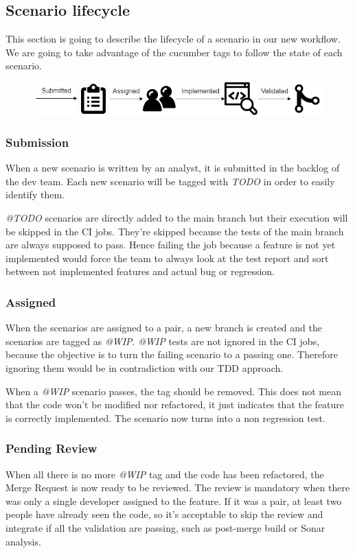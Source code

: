 \subsection{Scenario lifecycle}\label{subsec:scenario-lifecycle}
This section is going to describe the lifecycle of a scenario in our new
workflow.
We are going to take advantage of the cucumber tags to follow the state of
each scenario.

\begin{figure}
    \includegraphics[width=\textwidth]{../../resources/images/solution/scenario_lifecycle.png}
    \centering
\end{figure}

\subsubsection{Submission}
When a new scenario is written by an analyst, it is submitted in the backlog
of the dev team.
Each new scenario will be tagged with \textit{TODO} in order to easily identify
them.

\textit{@TODO} scenarios are directly added to the main branch but their
execution will be skipped in the CI jobs.
They're skipped because the tests of the main branch are always supposed to
pass.
Hence failing the job because a feature is not yet implemented would force the
team to always look at the test report and sort between not implemented
features and actual bug or regression.

\subsubsection{Assigned}
When the scenarios are assigned to a pair, a new branch is created and the
scenarios are tagged as \textit{@WIP}.
\textit{@WIP} tests are not ignored in the CI jobs, because the objective is
to turn the failing scenario to a passing one.
Therefore ignoring them would be in contradiction with our TDD approach.

When a \textit{@WIP }scenario passes, the tag should be removed.
This does not mean that the code won't be modified nor refactored, it
just indicates that the feature is correctly implemented.
The scenario now turns into a non regression test.

\subsubsection{Pending Review}
When all there is no more \textit{@WIP} tag and the code has been refactored,
the Merge Request is now ready to be reviewed.
The review is mandatory when there was only a single developer assigned to
the feature.
If it was a pair, at least two people have already seen the code, so it's
acceptable to skip the review and integrate if all the validation are
passing, such as post-merge build or Sonar analysis.

